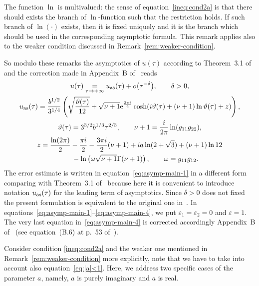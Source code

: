 \documentclass[pdftex]{sigma}
\numberwithin{equation}{section}
\begin{document}
\begin{Remark}
The function $\ln$ is multivalued: the sense of equation~\eqref{ineq:cond2a} is that there should exists the
branch of $\ln$-function such that the restriction holds. If such branch of $\ln(\cdot)$ exists, then it is
fixed uniquely and it is the branch which should be used in the corresponding asymptotic formula. This remark
applies also to the weaker condition discussed in Remark~\ref{rem:weaker-condition}.
\end{Remark}

So modulo these remarks the asymptotics of $u(\tau)$ according to Theorem~3.1 of~\cite{KV2004} and the
correction made in Appendix~B of~\cite{KV2010} reads
\begin{gather}
u(\tau)\underset{\tau\to+\infty}{=}u_{\rm as}(\tau)+o\big(\tau^{-\delta}\big),
\qquad \delta>0,\label{eq:asymp-main-1}\\
u_{\rm as}(\tau)=\frac{b^{1/2}}{3^{1/4}}
\left(\sqrt{\frac{\vartheta(\tau)}{12}}
+\sqrt{\nu+1} {\rm e}^{\frac{3\pi i}{4}}\cosh(i\vartheta(\tau)+(\nu+1)\ln\vartheta(\tau)+z)\right),\label{eq:asymp-main-2}\\
\vartheta(\tau)=3^{3/2}b^{1/3}\tau^{2/3},\qquad
\nu+1=\frac{i}{2\pi}\ln(g_{11}g_{22}),\label{eq:asymp-main-3}\\
z=\frac{\ln(2\pi)}{2}-\frac{\pi i}{2}-\frac{3\pi i}{2}(\nu+1)+ia\ln(2+\sqrt{3})+(\nu+1)\ln12\nonumber\\
\hphantom{z=}{}-\ln\left(\omega\sqrt{\nu+1}\Gamma(\nu+1)\right),\qquad \omega=g_{11}g_{12}.\label{eq:asymp-main-4}
\end{gather}
The error estimate is written in equation~\eqref{eq:asymp-main-1} in a different form comparing with
Theorem~3.1 of~\cite{KV2004} because here it is convenient to introduce notation $u_{\rm as}(\tau)$ for
the leading term of asymptotics. Since $\delta>0$ does not fixed the present formulation is equivalent
to the original one in~\cite{KV2004}. In equations~\eqref{eq:asymp-main-1}--\eqref{eq:asymp-main-4},
we put $\varepsilon_1=\varepsilon_2=0$ and $\varepsilon=1$. The very last equation in~\eqref{eq:asymp-main-4}
is corrected accordingly Appendix~B of~\cite{KV2010} (see equation~(B.6) at p.~53 of~\cite{KV2010}).

Consider condition \eqref{ineq:cond2a} and the weaker one mentioned in Remark~\ref{rem:weaker-condition} more
explicitly, note that we have to take into account also equation~\eqref{eq:|a|<1}. Here, we address two specific
cases of the parameter $a$, namely, $a$ is purely imaginary and $a$ is real.
\end{document}
